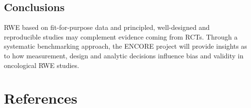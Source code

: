 \documentclass[
  letterpaper,
  DIV=11,
  numbers=noendperiod]{scrartcl}
\begin{document}
\subsection{Conclusions}\label{conclusions}

RWE based on fit-for-purpose data and principled, well-designed and
reproducible studies may complement evidence coming from RCTs. Through a
systematic benchmarking approach, the ENCORE project will provide
insights as to how measurement, design and analytic decisions influence
bias and validity in oncological RWE studies.

\newpage{}

\section*{References}\label{references}
\end{document}
